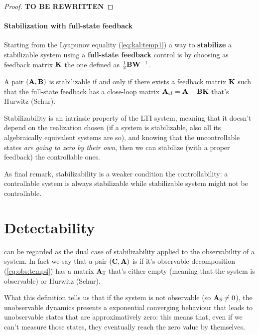 	\begin{proof}
		\textbf{TO BE REWRITTEN}
	\end{proof}
	
	\paragraph{Stabilization with full-state feedback} Starting from the Lyapunov equality (\ref{eq:kal:temp1}) a way to \textbf{stabilize} a stabilizable system using a \textbf{full-state feedback} control is by choosing as feedback matrix $\mathbf{K}$ the one defined as $\frac 1 2 \mathbf{B} \mathbf{W}^{-1}$.
	\begin{theorem}
		A pair $(\mathbf{A},\mathbf{B})$ is stabilizable if and only if there exists a feedback matrix $\mathbf{K}$ such that the full-state feedback has a close-loop matrix $\mathbf{A}_{cl} = \mathbf{A}-\mathbf{B}\mathbf{K}$ that's Hurwitz (Schur).
	\end{theorem}
	Stabilizability is an intrinsic property of the LTI system, meaning that it doesn't depend on the realization chosen (if a system is stabilizable, also all its algebraically equivalent systems are so), and knowing that the uncontrollable states \textit{are going to zero by their own}, then we can stabilize (with a proper feedback) the controllable ones.
	
	As final remark, stabilizability is a weaker condition the controllability: a controllable system is always stabilizable while stabilizable system might not be controllable.
	
\section{Detectability}
	 can be regarded as the dual case of stabilizability applied to the observability of a system. In fact we say that a pair $(\mathbf{C},\mathbf{A})$ is  if it's observable decomposition (\ref{eq:obs:temp4}) has a matrix $\mathbf{A}_{\overline o}$ that's either empty (meaning that the system is observable) or Hurwitz (Schur).
	
	What this definition tells us that if the system is not observable (so $\mathbf{A}_{\overline o}\neq 0$), the unobservable dynamics presents a exponential converging behaviour that leads to unobservable states that are approximatively zero: this means that, even if we can't measure those states, they eventually reach the zero value by themselves.
	
